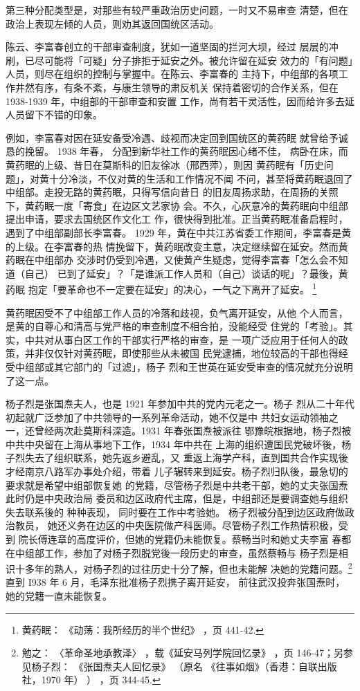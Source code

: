 第三种分配类型是，对那些有较严重政治历史问题，一时又不易审查
清楚，但在政治上表现左倾的人员，则劝其返回国统区活动。

陈云、李富春创立的干部审查制度，犹如一道坚固的拦河大坝，经过
层层的冲刷，已尽可能将「可疑」分子排拒于延安之外。被允许留在延安
效力的「有问题」人员，则尽在组织的控制与掌握中。在陈云、李富春的
主持下，中组部的各项工作井然有序，有条不紊，与康生领导的肃反机关
保持着密切的合作关系，但在 1938-1939 年，中组部的干部审查和安置
工作，尚有若干灵活性，因而给许多去延人员留下不错的印象。

例如，李富春对因在延安备受冷遇、歧视而决定回到国统区的黄药眠
就曾给予诚恳的挽留。
1938 年春，
分配到新华社工作的黄药眠因心绪不佳，
病卧在床，而黄药眠的上级、昔日在莫斯科的旧友徐冰（邢西萍），则因
黄药眠有「历史问题」，对黄十分冷淡，不仅对黄的生活和工作情况不闻
不问，甚至将黄药眠退回了中组部。走投无路的黄药眠，只得写信向昔日
的旧友周扬求助，在周扬的关照下，黄药眠一度「寄食」在边区文艺家协
会。不久，心灰意冷的黄药眠向中组部提出申请，要求去国统区作文化工
作，很快得到批准。正当黄药眠准备启程时，遇到了中组部副部长李富春。
1929 年，黄在中共江苏省委工作期间，李富春是黄的上级。在李富春的热
情挽留下，黄药眠改变主意，决定继续留在延安。然而黄药眠在中组部办
交涉时仍受到冷遇，又使黄产生疑虑，觉得李富春「怎么会不知道（自己）
已到了延安」？「是谁派工作人员和（自己）谈话的呢」？最後，黄药眠
抱定「要革命也不一定要在延安」的决心，一气之下离开了延安。
\footnote{黄药眠：
《动荡：我所经历的半个世纪》
，页 441-42. 
}

黄药眠因受不了中组部工作人员的冷落和歧视，负气离开延安，从他
个人而言，是黄的自尊心和清高与党严格的审查制度不相合拍，没能经受
住党的「考验」。其实，中共对从事白区工作的干部实行严格的审查，是
一项广泛应用于任何人的政策，并非仅仅针对黄药眠，即使那些从未被国
民党逮捕，地位较高的干部也得经受中组部或其它部门的「过滤」，杨子
烈和王世英在延安受审查的情况就充分说明了这一点。

杨子烈是张国焘夫人，也是 1921 年参加中共的党内元老之一。杨子
烈从二十年代初起就广泛参加了中共领导的一系列革命活动，她不仅是中
共妇女运动领袖之一，还曾经两次赴莫斯科深造。1931 年春张国焘被派往
鄂豫皖根据地，杨子烈被中共中央留在上海从事地下工作，1934 年中共在
上海的组织遭国民党破坏後，杨子烈失去了组织联系，她先返乡避乱，又
重返上海学产科，直到国共合作实现後才经南京八路军办事处介绍，带着
儿子辗转来到延安。杨子烈归队後，最急切的要求就是希望中组部恢复她
的党籍，尽管杨子烈是中共老干部，她的丈夫张国焘此时仍是中央政治局
委员和边区政府代主席，但是，中组部还是要调查她与组织失去联系後的
种种表现，
同时要在工作中考验她。
杨子烈被分配到边区政府做政治教员，
她还义务在边区的中央医院做产科医师。尽管杨子烈工作热情积极，受到
院长傅连章的高度评价，但她的党籍仍未能恢复。蔡畅当时和她丈夫李富
春都在中组部工作，参加了对杨子烈脱党後一段历史的审查，虽然蔡畅与
杨子烈是相识十多年的熟人，对杨子烈的过往历史十分了解，但也未能解
决她的党籍问题。\footnote{勉之：
〈革命圣地承教泽〉
，载《延安马列学院回忆录》
，页 146-47；另参见杨子烈：
《张国焘夫人回忆录》
（原名
《往事如烟》（香港：自联出版社，1970 年）
）
，页 344-45. 
}直到 I938 年 6 月，毛泽东批准杨子烈携子离开延安，
前往武汉投奔张国焘时，她的党籍一直未能恢复。

